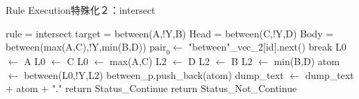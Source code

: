 \begin{algorithm}
    \caption{Rule Execution特殊化２：intersect}
\begin{algorithmic}
    \scriptsize
    \Require rule = intersect
    \Require target = between(A,!Y,B)
    \Require Head = {between(C,!Y,D)}
    \Require Body = {between(max(A,C),!Y,min(B,D))}
            \State $\text{pair}_0 \gets$ "between"\_vec\_2[id].next() 
             
                \State break
            \EndIf
                    \State L0 $\gets$ A
                    \State L0 $\gets$ C
                \Else
                    \State L0 $\gets$ max(A,C)
                \EndIf
                    \State L2 $\gets$ D
                    \State L2 $\gets$ B
                \Else
                    \State L2 $\gets$ min(B,D)
                \EndIf
                \State atom $\gets$ between(L0,!Y,L2)
                 
                    \State between\_p.push\_back(atom)
                \Else {}
                    \State dump\_text $\gets$ dump\_text + atom + "."
                \EndIf
                \State return Status\_Continue
        \EndWhile
        \State return Status\_Not\_Continue
    \EndProcedure
\end{algorithmic}
\end{algorithm}

